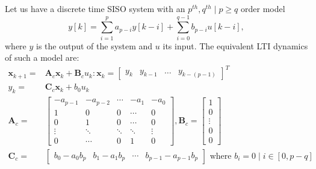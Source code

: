 \documentclass[sigconf]{llncs}
\newcommand{\mat}[1]{\boldsymbol{#1}}
\renewcommand{\vec}[1]{\boldsymbol{#1}}
\begin{document}
Let us have a discrete time SISO system with an $p^{th},q^{th} \mid p\geq q$ order model
$$y[k]=\sum_{i=1}^p a_{p-i}y[k-i]+\sum_{i=0}^{q-1} b_{p-i}u[k-i],$$
where $y$ is the output of the system and $u$ its input.
The equivalent LTI dynamics of such a model are:
\begin{align}
\label{eq:cf_SISO}
\vec{x}_{k+1}=&\mat{A}_c\vec{x}_k+\mat{B}_cu_k : \vec{x}_k=[\begin{array}{cccc}y_k&y_{k-1}&\hdots&y_{k-(p-1)}\end{array}]^T\\
y_k=&\mat{C}_c\vec{x}_k + b_0u_k\nonumber\\
\mat{A}_c=&\left[
\begin{array}{ccccc}
-a_{p-1}&-a_{p-2}&\cdots&-a_1&-a_0\\
1&0&0&\cdots&0\\
0&1&0&\cdots&0\\
\vdots&\ddots&\ddots&\ddots&\vdots\\
0&\cdots&0&1&0
\end{array}\right],
\mat{B}_c=\left[
\begin{array}{c}
1\\0\\ \vdots\\ 0\\ 0
\end{array}\right]\nonumber\\
\mat{C}_c=&[\begin{array}{ccccc}b_0-a_0b_p&b_1-a_1b_p&\cdots&b_{p-1}-a_{p-1}b_p\end{array}] \text{ where } b_i=0 \mid i \in [0, p-q]\nonumber
\end{align}
\end{document}
